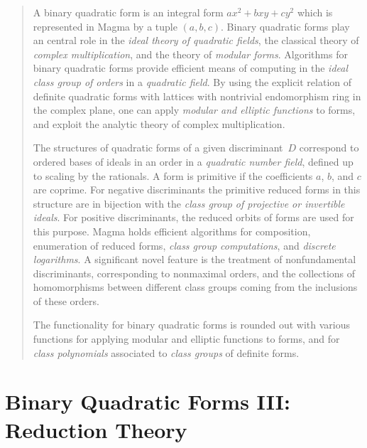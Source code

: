 \documentclass[11pt]{report}
\renewcommand{\vtwo}[2]{\left[
        \begin{matrix}#1\\#2
        \end{matrix}\right]}
\begin{document}
  {\small
    \begin{quote}
      A binary quadratic form is an integral form $ax^2 + bxy + cy^2$ which
      is represented in {\sc Magma} by a tuple $(a, b, c)$. Binary
      quadratic forms play an central role in the {\em ideal theory of
          quadratic fields}, the classical theory of {\em complex
          multiplication}, and the theory of {\em modular forms}. Algorithms
      for binary quadratic forms provide efficient means of computing in
      the {\em ideal class group of orders} in a {\em quadratic field}. By
      using the explicit relation of definite quadratic forms with lattices
      with nontrivial endomorphism ring in the complex plane, one can apply
        {\em modular and elliptic functions} to forms, and exploit the
      analytic theory of complex multiplication.

      The structures of quadratic forms of a given discriminant~$D$ correspond
      to ordered bases of ideals in an order in a {\em quadratic number field},
      defined up to scaling by the rationals. A form is primitive if the
      coefficients $a$, $b$, and $c$ are coprime. For negative discriminants the
      primitive reduced forms in this structure are in bijection with the
        {\em class group of projective or invertible ideals}. For positive
      discriminants, the reduced orbits of forms are used for this
      purpose. Magma holds efficient algorithms for composition, enumeration
      of reduced forms, {\em class group computations}, and
        {\em discrete logarithms}. A
      significant novel feature is the treatment of nonfundamental
      discriminants, corresponding to nonmaximal orders, and the collections
      of homomorphisms between different class groups coming from the
      inclusions of these orders.

      The functionality for binary quadratic forms is rounded out with
      various functions for applying modular and elliptic functions to
      forms, and for {\em class polynomials} associated to {\em class groups} of
      definite forms.
    \end{quote}
  }





\renewcommand{\vtwo}[2]{\left[
    \begin{matrix}#1 \\#2
    \end{matrix}\right]}
\chapter{Binary Quadratic Forms III: Reduction Theory}
\end{document}
